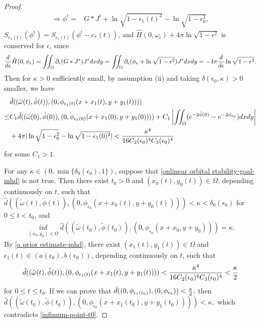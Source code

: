 \documentclass[1 [leqno, 11pt]{amsart}
\numberwithin{equation}{section}
\let\ep=\epsilon
\begin{document}
\begin{CJK*}{GBK}{song}
\begin{proof}
\begin{align*}
\Longrightarrow\phi^t=&G*J^t+\ln\sqrt{1-\ep_1(t)^2}-\ln\sqrt{1-\ep_0^2},
\end{align*}
$S_{\ep_1(t)}(\phi^t)=S_{\ep_1(t)}(\phi^t-c_*(t))$, and $\hat H(0,\omega_\ep)+4\pi\ln\sqrt{1-\ep^2}$ is conserved for $\ep$, since
\begin{align*}
{d\over d\ep}\hat H(0,\phi_{\ep})=\iint_{\Omega}\partial_\ep(G* J^\ep)J^\ep dxdy=\iint_{\Omega}\partial_\ep(\phi_\ep+\ln\sqrt{1-\ep^2})J^\ep dxdy=-4\pi{d\over d\ep}\ln\sqrt{1-\ep^2}.
\end{align*}
Then for $\kappa>0$ sufficiently small, by assumption (ii) and  taking $\delta(\ep_0,\kappa)>0$ smaller, we have
\begin{align}\nonumber
&\hat d((\tilde \omega(t),\tilde \phi(t)), ( 0, \phi_{\ep_1(t)}(x+x_1(t),y+y_1(t))))\\\nonumber
\leq& C_1 \hat d((\tilde \omega(0),\tilde \phi(0)), ( 0, \phi_{\ep_1(0)}(x+x_1(0),y+y_1(0))))+ C_1 \left|\iint_{\Omega}(e^{-2\tilde \phi(0)}-e^{-2\phi_{\ep_0}})dxdy\right|\\\label{de-c1-mhd}
&+4\pi|\ln\sqrt{1-\ep_0^2}-\ln\sqrt{1-\ep_1(0)^2}|
< {\kappa^4\over16C_2(\ep_0)^4C_3(\ep_0)^4}
\end{align}
for some $C_1>1$.

For any $\kappa\in(0,\min\{\delta_0(\ep_0), 1\})$, suppose that \eqref{onlinear orbital stability-goal-mhd} is not true. Then there exist  $t_0>0$ and $( x_0(t),y_0(t))\in\Omega$, depending continuously on $t$, such that $  \hat d((\tilde\omega(t),\tilde \phi(t)),(0,\phi_{\ep_0}(x+x_0(t),y+y_0(t))))<\kappa<\delta_0(\ep_0)$ for $0\leq t< t_0$, and
\begin{align}\label{infimum-point-t0}
 \inf_{(x_0,y_0)\in\Omega}\hat d((\tilde\omega(t_0),\tilde \phi(t_0)),(0,\phi_{\ep_0}(x+x_0,y+y_0)))=\kappa.
\end{align}
 By \eqref{a prior estimate-mhd},
 there exist $(x_1(t),y_1(t))\in\Omega$ and $\ep_1(t)\in(a(\ep_0),b(\ep_0))$, depending continuously on $t$, such that
\begin{align}\label{d-t0-ep1-mhd}
\hat d((\tilde \omega(t),\tilde \phi(t)),( 0, \phi_{\ep_1(t)}(x+x_1(t),y+y_1(t))))<{\kappa^4\over16C_2(\ep_0)^4C_3(\ep_0)^4}<{\kappa\over2}
\end{align}
for $0\leq t\leq t_0$.
If we can prove that
$
\hat d((0,\phi_{\ep_1(t_0)}),(0,\phi_{\ep_0}))<{\kappa\over 2},
$
 then
$
\hat d((\tilde \omega(t_0),\tilde \phi(t_0)),( 0, \phi_{\ep_0}(x+x_1(t_0),y+y_1(t_0))))<\kappa,
$
which contradicts \eqref{infimum-point-t0}.


\end{proof}
\end{CJK*}
\end{document}
